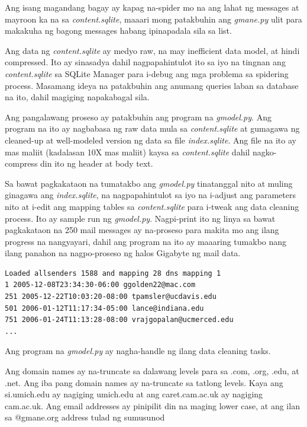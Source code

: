 \documentclass[10pt,]{book}
\begin{document}
Ang isang magandang bagay ay kapag na-spider mo na ang lahat ng messages
at mayroon ka na sa \emph{content.sqlite}, maaari mong patakbuhin ang
\emph{gmane.py} ulit para makakuha ng bagong messages habang ipinapadala
sila sa list.

Ang data ng \emph{content.sqlite} ay medyo raw, na may inefficient data
model, at hindi compressed. Ito ay sinasadya dahil nagpapahintulot ito
sa iyo na tingnan ang \emph{content.sqlite} sa SQLite Manager para
i-debug ang mga problema sa spidering process. Masamang ideya na
patakbuhin ang anumang queries laban sa database na ito, dahil magiging
napakabagal sila.

Ang pangalawang proseso ay patakbuhin ang program na \emph{gmodel.py}.
Ang program na ito ay nagbabasa ng raw data mula sa
\emph{content.sqlite} at gumagawa ng cleaned-up at well-modeled version
ng data sa file \emph{index.sqlite}. Ang file na ito ay mas maliit
(kadalasan 10X mas maliit) kaysa sa \emph{content.sqlite} dahil
nagko-compress din ito ng header at body text.

Sa bawat pagkakataon na tumatakbo ang \emph{gmodel.py} tinatanggal nito
at muling ginagawa ang \emph{index.sqlite}, na nagpapahintulot sa iyo na
i-adjust ang parameters nito at i-edit ang mapping tables sa
\emph{content.sqlite} para i-tweak ang data cleaning process. Ito ay
sample run ng \emph{gmodel.py}. Nagpi-print ito ng linya sa bawat
pagkakataon na 250 mail messages ay na-proseso para makita mo ang ilang
progress na nangyayari, dahil ang program na ito ay maaaring tumakbo
nang ilang panahon na nagpo-proseso ng halos Gigabyte ng mail data.

{\small
\begin{verbatim}
Loaded allsenders 1588 and mapping 28 dns mapping 1
1 2005-12-08T23:34:30-06:00 ggolden22@mac.com
251 2005-12-22T10:03:20-08:00 tpamsler@ucdavis.edu
501 2006-01-12T11:17:34-05:00 lance@indiana.edu
751 2006-01-24T11:13:28-08:00 vrajgopalan@ucmerced.edu
...
\end{verbatim}
}

Ang program na \emph{gmodel.py} ay nagha-handle ng ilang data cleaning
tasks.

Ang domain names ay na-truncate sa dalawang levels para sa .com, .org,
.edu, at .net. Ang iba pang domain names ay na-truncate sa tatlong
levels. Kaya ang si.umich.edu ay nagiging umich.edu at ang
caret.cam.ac.uk ay nagiging cam.ac.uk. Ang email addresses ay pinipilit
din na maging lower case, at ang ilan sa @gmane.org address tulad ng
sumusunod
\end{document}
